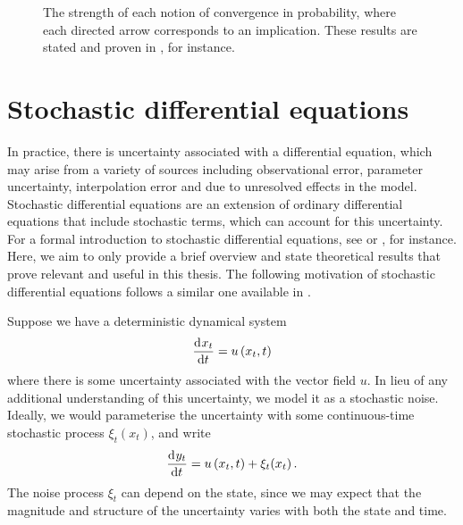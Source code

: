 \usetikzlibrary{positioning}
\begin{figure}
	\begin{center}
		\caption{The strength of each notion of convergence in probability, where each directed arrow corresponds to an implication.
			These results are stated and proven in \citet{Bremaud_2020_ProbabilityTheoryStochastic}, for instance.}
		\label{fig:rv_conv_impl}
	\end{center}
\end{figure}



\section{Stochastic differential equations}
In practice, there is uncertainty associated with a differential equation, which may arise from a variety of sources including observational error, parameter uncertainty, interpolation error and due to unresolved effects in the model.
Stochastic differential equations are an extension of ordinary differential equations that include stochastic terms, which can account for this uncertainty.
For a formal introduction to stochastic differential equations, see \citet{Oksendal_2003_StochasticDifferentialEquations} or \citet{KallianpurSundar_2014_StochasticAnalysisDiffusion}, for instance.
Here, we aim to only provide a brief overview and state theoretical results that prove relevant and useful in this thesis.
The following motivation of stochastic differential equations follows a similar one available in \citet{Oksendal_2003_StochasticDifferentialEquations}.

Suppose we have a deterministic dynamical system
\[
	\dod{x_t}{t} = u\left(x_t, t\right)
\]
where there is some uncertainty associated with the vector field \(u\).
In lieu of any additional understanding of this uncertainty, we model it as a stochastic noise.
Ideally, we would parameterise the uncertainty with some continuous-time stochastic process \(\xi_t\!\left(x_t\right)\), and write
\[
	\dod{y_t}{t} = u\left(x_t, t\right) + \xi_t\!\left(x_t\right).
\]
The noise process \(\xi_t\) can depend on the state, since we may expect that the magnitude and structure of the uncertainty varies with both the state and time.


